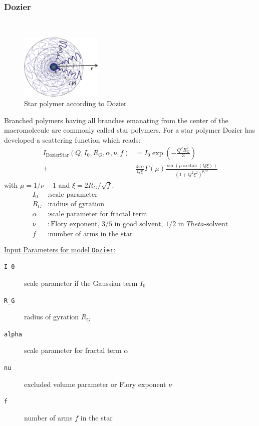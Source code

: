 \subsubsection{Dozier}
\label{sect:DozierStar1}
~\\
\begin{figure}[htb]
\begin{center}
\includegraphics[width=0.346\textwidth,height=0.278\textwidth]{Dozier.png}
\end{center}
\caption{Star polymer according to Dozier} \label{fig:DozierStar}
\end{figure}
Branched polymers having all branches emanating from
the center of the macromolecule are commonly called star
polymers. For a star polymer Dozier \cite{dozier91} has developed
a scattering function which reads:
\begin{align}
I_\text{DozierStar}(Q,I_0,R_G,\alpha,\nu,f)
& = I_0 \exp\left(-\frac{Q^2R_G^2}{3}\right) \\
+& \frac{4\pi\alpha}{Q\xi} \Gamma(\mu)
\frac{\sin(\mu\arctan(Q\xi))}{(1+Q^2\xi^2)^{\mu/2}} \nonumber
\end{align}
with $\mu=1/\nu-1$ and $\xi=2R_G/\sqrt{f}$.
\begin{align}
I_0      & : \text{scale parameter} \nonumber \\
R_G      & : \text{radius of gyration} \nonumber \\
\alpha   & : \text{scale parameter for fractal term} \nonumber \\
\nu      & : \text{Flory exponent, 3/5 in good solvent, 1/2 in $Theta$-solvent} \nonumber \\
f        & : \text{number of arms in the star} \nonumber
\end{align}

\vspace{5mm}

\noindent
\underline{Input Parameters for model \texttt{Dozier}:}
\begin{description}
\item[\texttt{I\_0}] scale parameter if the Gaussian term $I_0$
\item[\texttt{R\_G}] radius of gyration $R_G$
\item[\texttt{alpha}] scale parameter for fractal term $\alpha$
\item[\texttt{nu}] excluded volume parameter or Flory exponent $\nu$
\item[\texttt{f}]  number of arms $f$ in the star
\end{description}
\vspace{5mm}

